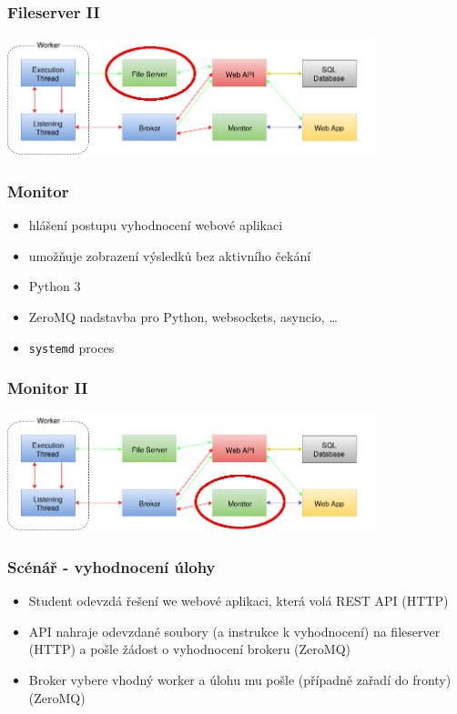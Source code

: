 \documentclass{beamer}
\begin{document}
\begin{frame}
	\frametitle{Fileserver II}
	\begin{center}
		\includegraphics[width=0.8\textwidth]{images/communication-fileserver.png}
	\end{center}
\end{frame}

\begin{frame}
	\frametitle{Monitor}
	\begin{itemize}
		\item hlášení postupu vyhodnocení webové aplikaci
		\item umožňuje zobrazení výsledků bez aktivního čekání
		\item Python 3
		\item ZeroMQ nadstavba pro Python, websockets, asyncio, \dots
		\item \texttt{systemd} proces
	\end{itemize}
\end{frame}

\begin{frame}
	\frametitle{Monitor II}
	\begin{center}
		\includegraphics[width=0.8\textwidth]{images/communication-monitor.png}
	\end{center}
\end{frame}

\begin{frame}
	\frametitle{Scénář - vyhodnocení úlohy}
	\begin{itemize}
		\item Student odevzdá řešení we webové aplikaci, která volá REST API (HTTP)
		\item API nahraje odevzdané soubory (a instrukce k vyhodnocení) na fileserver (HTTP) a pošle žádost o vyhodnocení brokeru (ZeroMQ)
		\item Broker vybere vhodný worker a úlohu mu pošle (případně zařadí do fronty) (ZeroMQ)
	\end{itemize}
\end{frame}
\end{document}
